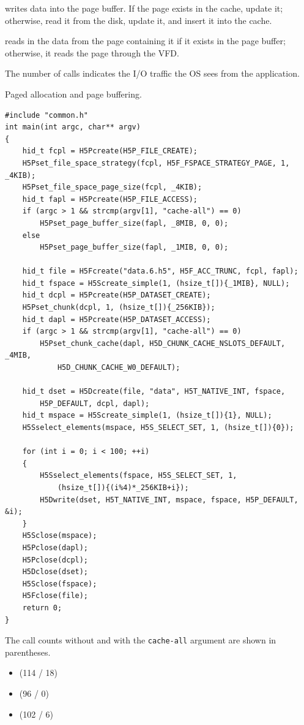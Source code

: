  writes data into the page buffer. If the page exists in the cache, update it; otherwise, read it from the disk, update it, and insert it into the cache.

 reads in the data from the page containing it if it exists in the page buffer; otherwise, it reads the page through the VFD.

The number of  calls indicates the I/O traffic the OS sees from the application.

\begin{listing}
\centering
\caption{Paged allocation and page buffering.}
\label{lst:pages}
\begin{verbatim}
#include "common.h"
int main(int argc, char** argv)
{
    hid_t fcpl = H5Pcreate(H5P_FILE_CREATE);
    H5Pset_file_space_strategy(fcpl, H5F_FSPACE_STRATEGY_PAGE, 1, _4KIB);
    H5Pset_file_space_page_size(fcpl, _4KIB);
    hid_t fapl = H5Pcreate(H5P_FILE_ACCESS);
    if (argc > 1 && strcmp(argv[1], "cache-all") == 0)
        H5Pset_page_buffer_size(fapl, _8MIB, 0, 0);
    else
        H5Pset_page_buffer_size(fapl, _1MIB, 0, 0);

    hid_t file = H5Fcreate("data.6.h5", H5F_ACC_TRUNC, fcpl, fapl);
    hid_t fspace = H5Screate_simple(1, (hsize_t[]){_1MIB}, NULL);
    hid_t dcpl = H5Pcreate(H5P_DATASET_CREATE);
    H5Pset_chunk(dcpl, 1, (hsize_t[]){_256KIB});
    hid_t dapl = H5Pcreate(H5P_DATASET_ACCESS);
    if (argc > 1 && strcmp(argv[1], "cache-all") == 0)
        H5Pset_chunk_cache(dapl, H5D_CHUNK_CACHE_NSLOTS_DEFAULT, _4MIB,
            H5D_CHUNK_CACHE_W0_DEFAULT);

    hid_t dset = H5Dcreate(file, "data", H5T_NATIVE_INT, fspace,
        H5P_DEFAULT, dcpl, dapl);
    hid_t mspace = H5Screate_simple(1, (hsize_t[]){1}, NULL);
    H5Sselect_elements(mspace, H5S_SELECT_SET, 1, (hsize_t[]){0});

    for (int i = 0; i < 100; ++i)
    {
        H5Sselect_elements(fspace, H5S_SELECT_SET, 1,
            (hsize_t[]){(i%4)*_256KIB+i});
        H5Dwrite(dset, H5T_NATIVE_INT, mspace, fspace, H5P_DEFAULT, &i);
    }
    H5Sclose(mspace);
    H5Pclose(dapl);
    H5Pclose(dcpl);
    H5Dclose(dset);
    H5Sclose(fspace);
    H5Fclose(file);
    return 0;
}
\end{verbatim}
\end{listing}

The call counts without and with the \texttt{cache-all} argument are shown in parentheses.
\begin{itemize}
    \item {} (114 / 18)
    \item {} (96 / 0)
    \item {} (102 / 6)
\end{itemize}

